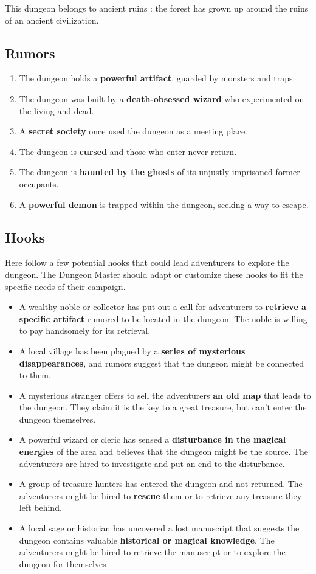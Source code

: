 This dungeon belongs to ancient ruins :
the forest has grown up around the ruins of an ancient civilization.

\subsection{Rumors}
\begin{enumerate}
  \item The dungeon holds a \textbf{powerful artifact}, guarded by monsters and traps.
  \item The dungeon was built by a \textbf{death-obsessed wizard} who experimented on the living and dead.
  \item A \textbf{secret society} once used the dungeon as a meeting place.
  \item The dungeon is \textbf{cursed} and those who enter never return.
  \item The dungeon is \textbf{haunted by the ghosts} of its unjustly imprisoned former occupants.
  \item A \textbf{powerful demon} is trapped within the dungeon, seeking a way to escape.
\end{enumerate}

\subsection{Hooks}
Here follow a few potential hooks that could lead adventurers to explore the dungeon. 
The Dungeon Master should adapt or customize these hooks to fit the specific needs of their campaign.

\begin{itemize}
  \item A wealthy noble or collector has put out a call for adventurers to \textbf{retrieve a specific artifact} rumored to be located in the dungeon.
  The noble is willing to pay handsomely for its retrieval.
  \item A local village has been plagued by a \textbf{series of mysterious disappearances}, and rumors suggest that the dungeon might be connected to them.
  \item A mysterious stranger offers to sell the adventurers \textbf{an old map} that leads to the dungeon.
  They claim it is the key to a great treasure, but can't enter the dungeon themselves.
  \item A powerful wizard or cleric has sensed a \textbf{disturbance in the magical energies} of the area and believes that the dungeon might be the source. 
  The adventurers are hired to investigate and put an end to the disturbance.
  \item A group of treasure hunters has entered the dungeon and not returned. 
  The adventurers might be hired to \textbf{rescue} them or to retrieve any treasure they left behind.
  \item A local sage or historian has uncovered a lost manuscript that suggests the dungeon contains valuable \textbf{historical or magical knowledge}. 
  The adventurers might be hired to retrieve the manuscript or to explore the dungeon for themselves
\end{itemize}

